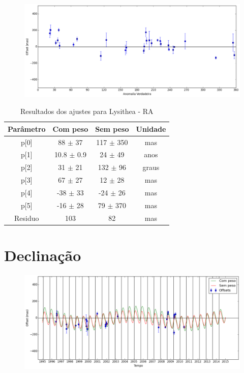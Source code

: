 \documentclass[11pt,a4paper]{report}
\begin{document}
\begin{figure}[h]
\includegraphics[scale=0.45]{Lysithea/RA_anom.png}  
\end{figure}

\begin{table}[h!]
\caption{\label{Tab: Lysithea-RA} Resultados dos ajustes para Lysithea - RA}
\begin{centering}
\begin{tabular}{cccc}
\hline
\hline
Parâmetro & Com peso & Sem peso & Unidade\tabularnewline
\hline
p[0] & 88 $\pm$ 37 & 117 $\pm$ 350 & mas\\
p[1] & 10.8 $\pm$ 0.9 & 24 $\pm$ 49 & anos\\
p[2] & 31 $\pm$ 21 & 132 $\pm$ 96 & graus\\
p[3] & 67 $\pm$ 27 & 12 $\pm$ 28 & mas\\
p[4] & -38 $\pm$ 33 & -24 $\pm$ 26 & mas\\
p[5] & -16 $\pm$ 28 & 79 $\pm$ 370 & mas\\
Residuo & 103 & 82 & mas\\
\hline 
\end{tabular} 
\par\end{centering}
\end{table}

\section*{Declinação}

\begin{figure}[h]
\includegraphics[scale=0.45]{Lysithea/DEC.png} 
\end{figure}
\end{document}
